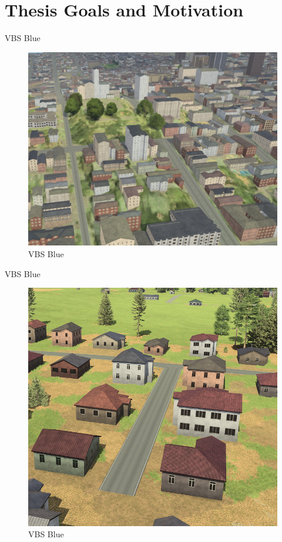 \documentclass{beamer}
\author[\FirstNameAbbreviated. \LastName]{\FirstName{} \LastName{} \\{\small \Supervisor}}
\title{\DissertationTitle}
\institute[\FacultyAndUniversityAbbr]{\Department\\ \Faculty\\ \University\\}
\date{June 26, 2024}
\begin{document}
\begin{frame}
\titlepage
\end{frame}

\section{Thesis Goals and Motivation}
\begin{frame}{VBS Blue}
    \begin{figure}
        \centering
        \includegraphics[width=0.75\linewidth]{img/VBSBlue1.png}
        \caption{VBS Blue}
    \end{figure}
\end{frame}

\begin{frame}{VBS Blue}
    \begin{figure}
        \centering
        \includegraphics[width=0.7\linewidth]{img/VBSBlue2.png}
        \caption{VBS Blue}
    \end{figure}
\end{frame}
\end{document}
